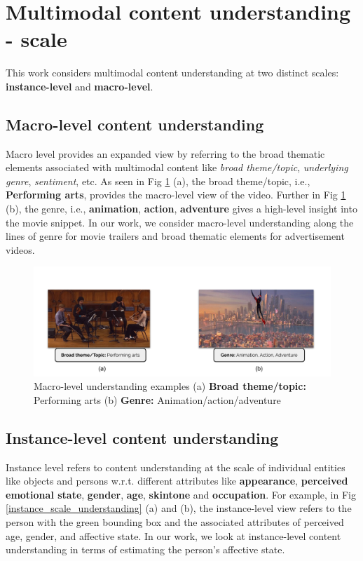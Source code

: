 \section{Multimodal content understanding - scale}

This work considers multimodal content understanding at two distinct scales: \textbf{instance-level} and \textbf{macro-level}. 

\subsection{Macro-level content understanding}
Macro level provides an expanded view by referring to the broad thematic elements associated with multimodal content like \textit{broad theme/topic}, \textit{underlying genre}, \textit{sentiment}, etc. As seen in Fig \ref{macro_scale_understanding} (a), the broad theme/topic, i.e., \textbf{Performing arts}, provides the macro-level view of the video. Further in Fig  \ref{macro_scale_understanding} (b), the genre, i.e., \textbf{animation}, \textbf{action}, \textbf{adventure} gives a high-level insight into the movie snippet. In our work, we consider macro-level understanding along the lines of genre for movie trailers and broad thematic elements for advertisement videos. 
\begin{figure}
 \centering
    \includegraphics[width=\textwidth]{figures/macro_scale_understanding.pdf}
    \caption{Macro-level understanding examples (a) \textbf{Broad theme/topic:} Performing arts (b) \textbf{Genre:} Animation/action/adventure}
    \label{macro_scale_understanding}
\end{figure}

\subsection{Instance-level content understanding}

Instance level refers to content understanding at the scale of individual entities like objects and persons w.r.t. different attributes like \textbf{appearance}, \textbf{perceived emotional state}, \textbf{gender}, \textbf{age}, \textbf{skintone} and \textbf{occupation}. For example, in Fig \ref{instance_scale_understanding} (a) and (b), the instance-level view refers to the person with the green bounding box and the associated attributes of perceived age, gender, and affective state. In our work, we look at instance-level content understanding in terms of estimating the person's affective state.

